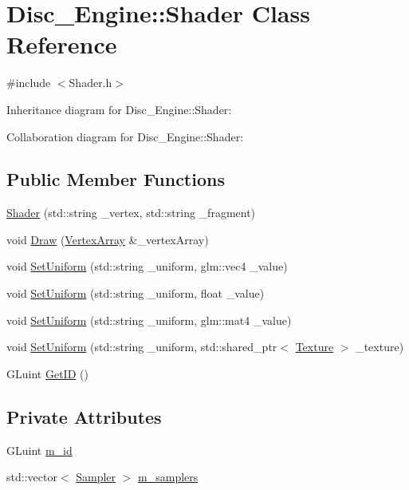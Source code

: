 \hypertarget{class_disc___engine_1_1_shader}{}\section{Disc\+\_\+\+Engine\+:\+:Shader Class Reference}
\label{class_disc___engine_1_1_shader}


{\ttfamily \#include $<$Shader.\+h$>$}



Inheritance diagram for Disc\+\_\+\+Engine\+:\+:Shader\+:


Collaboration diagram for Disc\+\_\+\+Engine\+:\+:Shader\+:
\subsection*{Public Member Functions}
\begin{DoxyCompactItemize}
\item 
\mbox{\hyperlink{class_disc___engine_1_1_shader_a992a94b53b626149a64d4b83988f59d3}{Shader}} (std\+::string \+\_\+vertex, std\+::string \+\_\+fragment)
\item 
void \mbox{\hyperlink{class_disc___engine_1_1_shader_a8325d8ee791234cfb6caa333b5384695}{Draw}} (\mbox{\hyperlink{class_disc___engine_1_1_vertex_array}{Vertex\+Array}} \&\+\_\+vertex\+Array)
\item 
void \mbox{\hyperlink{class_disc___engine_1_1_shader_a6b06fcd4b111d0d37d53ee64ae72ad2b}{Set\+Uniform}} (std\+::string \+\_\+uniform, glm\+::vec4 \+\_\+value)
\item 
void \mbox{\hyperlink{class_disc___engine_1_1_shader_aaef99a497e0dafa54963722c2b83c870}{Set\+Uniform}} (std\+::string \+\_\+uniform, float \+\_\+value)
\item 
void \mbox{\hyperlink{class_disc___engine_1_1_shader_a129891a7f878122fe56357b16d5f6b1c}{Set\+Uniform}} (std\+::string \+\_\+uniform, glm\+::mat4 \+\_\+value)
\item 
void \mbox{\hyperlink{class_disc___engine_1_1_shader_a479f29b49b7e1a7326995415c3175c3a}{Set\+Uniform}} (std\+::string \+\_\+uniform, std\+::shared\+\_\+ptr$<$ \mbox{\hyperlink{class_disc___engine_1_1_texture}{Texture}} $>$ \+\_\+texture)
\item 
G\+Luint \mbox{\hyperlink{class_disc___engine_1_1_shader_ac77c9f2dc144eeb40c6c07182d69c308}{Get\+ID}} ()
\end{DoxyCompactItemize}
\subsection*{Private Attributes}
\begin{DoxyCompactItemize}
\item 
G\+Luint \mbox{\hyperlink{class_disc___engine_1_1_shader_aada3554645b154451f9da5f7683ab6ef}{m\+\_\+id}}
\item 
std\+::vector$<$ \mbox{\hyperlink{struct_disc___engine_1_1_sampler}{Sampler}} $>$ \mbox{\hyperlink{class_disc___engine_1_1_shader_a63a34fc1f35b70acfcf2d8113d2bf29c}{m\+\_\+samplers}}
\end{DoxyCompactItemize}


